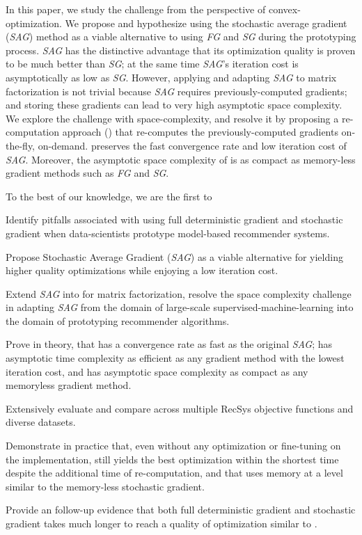 In this paper, we study the challenge from the perspective of convex-optimization.  
We propose and hypothesize using the stochastic average gradient (\emph{SAG}) method \cite{schmidt2013minimizing, roux2012stochastic} as a viable alternative to using \emph{FG} and \emph{SG} during the prototyping process.  
\emph{SAG} has the distinctive advantage that its optimization quality is proven to be much better than \emph{SG}; at the same time \emph{SAG}'s iteration cost is asymptotically as low as \emph{SG}.  
However, applying and adapting \emph{SAG} to matrix factorization is not trivial because \emph{SAG} requires previously-computed gradients; 
and storing these gradients can lead to very high asymptotic space complexity.  
We explore the challenge with space-complexity, and resolve it by proposing a re-computation approach (\tool) that re-computes the previously-computed gradients on-the-fly, on-demand.  
\tool preserves the fast convergence rate and low iteration cost of \emph{SAG}.  
Moreover, the asymptotic space complexity of \tool is as compact as memory-less gradient methods such as \emph{FG} and \emph{SG}.  

To the best of our knowledge, we are the first to
\begin{sloppy}
\begin{compactitem}
\item Identify pitfalls associated with using full deterministic gradient and stochastic gradient when data-scientists prototype model-based recommender systems.  
\item Propose Stochastic Average Gradient (\emph{SAG}) as a viable alternative for yielding higher quality optimizations while enjoying a low iteration cost.  
\item Extend \emph{SAG} into \tool for matrix factorization, resolve the space complexity challenge in adapting \emph{SAG} from the domain of large-scale supervised-machine-learning into the domain of prototyping recommender algorithms.  
\item Prove in theory, that \tool has a convergence rate as fast as the original \emph{SAG}; \tool has asymptotic time complexity as efficient as any gradient method with the lowest iteration cost, and \tool has asymptotic space complexity as compact as any memoryless gradient method.  
\item Extensively evaluate and compare \tool across multiple RecSys objective functions and diverse datasets.  
\item Demonstrate in practice that, even without any optimization or fine-tuning on the implementation, \tool still yields the best optimization within the shortest time despite the additional time of re-computation, and that \tool uses memory at a level similar to the memory-less stochastic gradient. 
\item Provide an follow-up evidence that both full deterministic gradient and stochastic gradient takes much longer to reach a quality of optimization similar to \tool.
\end {compactitem}
\end{sloppy}
